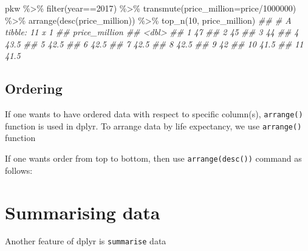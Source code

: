 \documentclass[
  letterpaper,
  DIV=11,
  numbers=noendperiod]{scrartcl}
\newenvironment{Shaded}{\begin{snugshade}}{\end{snugshade}}
\newcommand{\AttributeTok}[1]{\textcolor[rgb]{0.40,0.45,0.13}{#1}}
\newcommand{\DecValTok}[1]{\textcolor[rgb]{0.68,0.00,0.00}{#1}}
\newcommand{\DocumentationTok}[1]{\textcolor[rgb]{0.37,0.37,0.37}{\textit{#1}}}
\newcommand{\FunctionTok}[1]{\textcolor[rgb]{0.28,0.35,0.67}{#1}}
\newcommand{\NormalTok}[1]{\textcolor[rgb]{0.00,0.23,0.31}{#1}}
\newcommand{\SpecialCharTok}[1]{\textcolor[rgb]{0.37,0.37,0.37}{#1}}
\begin{document}
\begin{Shaded}
\begin{Highlighting}[]

\NormalTok{pkw }\SpecialCharTok{\%\textgreater{}\%} \FunctionTok{filter}\NormalTok{(year}\SpecialCharTok{==}\DecValTok{2017}\NormalTok{) }\SpecialCharTok{\%\textgreater{}\%} 
  \FunctionTok{transmute}\NormalTok{(}\AttributeTok{price\_million=}\NormalTok{price}\SpecialCharTok{/}\DecValTok{1000000}\NormalTok{) }\SpecialCharTok{\%\textgreater{}\%} 
  \FunctionTok{arrange}\NormalTok{(}\FunctionTok{desc}\NormalTok{(price\_million)) }\SpecialCharTok{\%\textgreater{}\%} 
  \FunctionTok{top\_n}\NormalTok{(}\DecValTok{10}\NormalTok{, price\_million)}
\DocumentationTok{\#\# \# A tibble: 11 x 1}
\DocumentationTok{\#\#    price\_million}
\DocumentationTok{\#\#            \textless{}dbl\textgreater{}}
\DocumentationTok{\#\#  1          47  }
\DocumentationTok{\#\#  2          45  }
\DocumentationTok{\#\#  3          44  }
\DocumentationTok{\#\#  4          43.5}
\DocumentationTok{\#\#  5          42.5}
\DocumentationTok{\#\#  6          42.5}
\DocumentationTok{\#\#  7          42.5}
\DocumentationTok{\#\#  8          42.5}
\DocumentationTok{\#\#  9          42  }
\DocumentationTok{\#\# 10          41.5}
\DocumentationTok{\#\# 11          41.5}
\end{Highlighting}
\end{Shaded}

\hypertarget{ordering}{%
\subsection{Ordering}\label{ordering}}

If one wants to have ordered data with respect to specific column(s),
\texttt{arrange()} function is used in dplyr. To arrange data by life
expectancy, we use \texttt{arrange()} function

If one wants order from top to bottom, then use \texttt{arrange(desc())}
command as follows:

\hypertarget{summarising-data}{%
\section{Summarising data}\label{summarising-data}}

Another feature of dplyr is \texttt{summarise} data
\end{document}
